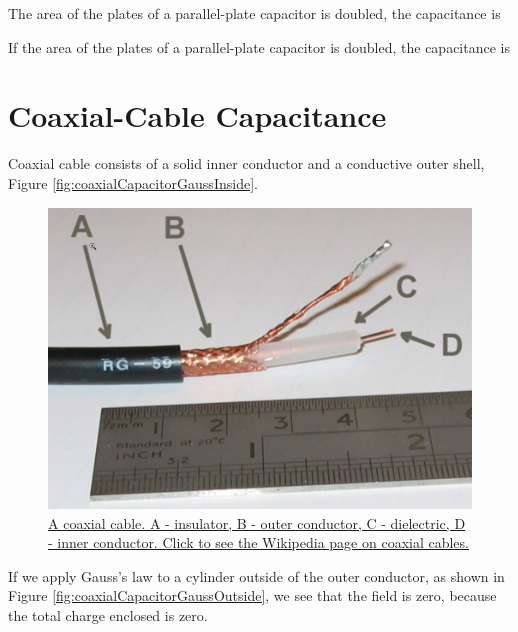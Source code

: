 \documentclass{ximera}
\begin{document}
\begin{question}  
The area of the plates of a parallel-plate capacitor is doubled, the capacitance is 

 
\begin{multipleChoice}  
\end{multipleChoice}  
\end{question} 
If the area of the plates of a parallel-plate capacitor is doubled, the capacitance is 


\section{Coaxial-Cable Capacitance}

Coaxial cable consists of a solid  inner conductor and a conductive outer shell, Figure \ref{fig:coaxialCapacitorGaussInside}.


\begin{figure}[htbp]
\begin{center}
\includegraphics[scale=0.3]{../jpg/coaxialCable.jpg}
\end{center}
\caption{\href{https://en.wikipedia.org/wiki/Coaxial_cable}{A coaxial cable. A - insulator, B - outer conductor, C - dielectric, D - inner conductor. Click to see the Wikipedia page on coaxial cables. } }
\label{fig:coax}
\end{figure}


If we apply Gauss's law to a cylinder outside of the outer conductor, as shown in Figure \ref{fig:coaxialCapacitorGaussOutside}, we see that the field is zero, because the total charge enclosed is zero. 
\end{document}
